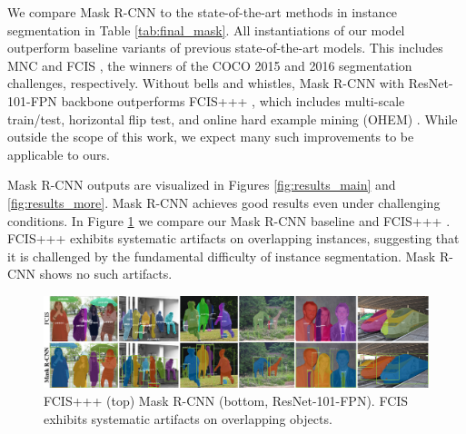 \documentclass[10pt,twocolumn,letterpaper]{article}
\begin{document}
We compare Mask R-CNN to the state-of-the-art methods in instance segmentation in Table \ref{tab:final_mask}. All instantiations of our model outperform baseline variants of previous state-of-the-art models. This includes MNC \cite{Dai2016} and FCIS \cite{Li2017}, the winners of the COCO 2015 and 2016 segmentation challenges, respectively. Without bells and whistles, Mask R-CNN with ResNet-101-FPN backbone outperforms FCIS+++ \cite{Li2017}, which includes multi-scale train/test, horizontal flip test, and online hard example mining (OHEM) \cite{Shrivastava2016}. While outside the scope of this work, we expect many such improvements to be applicable to ours.

Mask R-CNN outputs are visualized in Figures \ref{fig:results_main} and \ref{fig:results_more}. Mask R-CNN achieves good results even under challenging conditions. In Figure \ref{fig:results_vs_fcis} we compare our Mask R-CNN baseline and FCIS+++ \cite{Li2017}. FCIS+++ exhibits systematic artifacts on overlapping instances, suggesting that it is challenged by the fundamental difficulty of instance segmentation. Mask R-CNN shows no such artifacts.

\begin{figure}[t]
\centering
\includegraphics[width=1.0\linewidth]{ai/results_vs_fcis}
\caption{FCIS+++ \cite{Li2017} (top) \vs Mask R-CNN (bottom, ResNet-101-FPN). FCIS exhibits systematic artifacts on overlapping objects.}
\label{fig:results_vs_fcis}
\end{figure}
\end{document}
